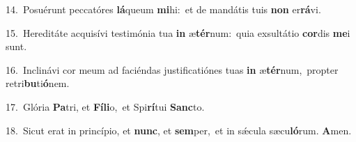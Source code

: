 {\numbfont\textcolor{\numbcolor}{14.}}~Posuérunt peccatóres \textbf{lá}\-queum \textbf{mi}\-hi:~\star et de mandátis tuis \textbf{non} er\-\textbf{rá}\-vi.\par
{\numbfont\textcolor{\numbcolor}{15.}}~Hereditáte acquisívi testimónia tua \textbf{in} æ\-\textbf{tér}\-num:~\star quia exsultátio \textbf{cor}\-dis \textbf{me}\-i sunt.\par
{\numbfont\textcolor{\numbcolor}{16.}}~Inclinávi cor meum ad faciéndas justificatiónes tuas \textbf{in} æ\-\textbf{tér}\-num,~\star propter retri\-\textbf{bu}\-ti\-\textbf{ó}\-nem.\par
{\numbfont\textcolor{\numbcolor}{17.}}~Glória \textbf{Pa}\-tri, et \textbf{Fí}\-\textbf{li}o,~\star et Spi\-\textbf{rí}\-tui \textbf{Sanc}\-to.\par
{\numbfont\textcolor{\numbcolor}{18.}}~Sicut erat in princípio, et \textbf{nunc}\-, et \textbf{sem}\-per,~\star et in sǽcula sæcu\-\textbf{ló}\-rum. \textbf{A}\-men.\par
